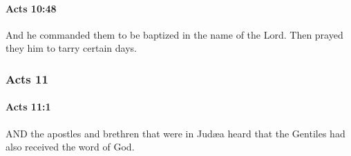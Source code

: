 		\paragraph{Acts 10:48} %
			\label{ACTS-10-48}

			And he commanded them to be baptized in the name of the Lord.  Then prayed they him to tarry certain days.

			\begin{framed}
			\scriptsize
				\begin{compactdesc}
					\item[SBLG] 
				\end{compactdesc}
			\end{framed}

	\subsubsection{Acts 11} %
		\label{ACTS-11}
		
		\paragraph{Acts 11:1} %
			\label{ACTS-11-1}

			AND the apostles and brethren that were in Judæa heard that the Gentiles had also received the word of God.

